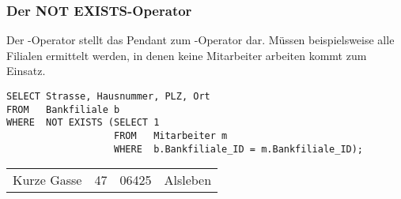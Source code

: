         \subsubsection{Der NOT EXISTS-Operator}
          Der -Operator stellt das Pendant zum -Operator dar. M\"ussen beispielsweise alle Filialen ermittelt werden, in denen keine Mitarbeiter arbeiten kommt  zum Einsatz.
          \begin{lstlisting}[language=oracle_sql,caption={Der \languageorasql{NOT EXISTS}-Operator},label=sql06_09]
SELECT Strasse, Hausnummer, PLZ, Ort
FROM   Bankfiliale b
WHERE  NOT EXISTS (SELECT 1
                   FROM   Mitarbeiter m
                   WHERE  b.Bankfiliale_ID = m.Bankfiliale_ID);
          \end{lstlisting}
          \begin{center}
            \begin{small}
              \tablehead{}

              \begin{msoraclesql}
                \begin{supertabular}{llll}
                  Kurze Gasse & 47 & 06425 & Alsleben \\
                \end{supertabular}
              \end{msoraclesql}
            \end{small}
          \end{center}
